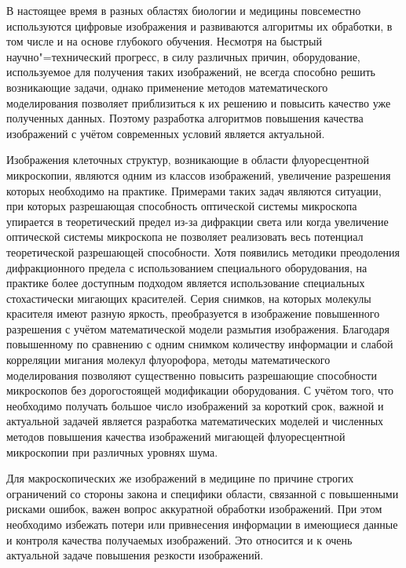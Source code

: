 
{\actuality} 

В настоящее время в разных областях биологии и медицины повсеместно используются цифровые изображения и развиваются алгоритмы их обработки, в том числе и на основе глубокого обучения. Несмотря на быстрый научно"=технический прогресс, в силу различных причин, оборудование, используемое для получения таких изображений, не всегда способно решить возникающие задачи, однако применение методов математического моделирования позволяет приблизиться к их решению и повысить качество уже полученных данных. Поэтому разработка алгоритмов повышения качества изображений с учётом современных условий является актуальной.

Изображения клеточных структур, возникающие в области флуоресцентной микроскопии, являются одним из классов изображений, увеличение разрешения которых необходимо на практике. Примерами таких задач являются ситуации, при которых разрешающая способность оптической системы микроскопа упирается в теоретический предел из-за дифракции света или когда увеличение оптической системы микроскопа не позволяет реализовать весь потенциал теоретической разрешающей способности. Хотя появились методики преодоления дифракционного предела с использованием специального оборудования, на практике более доступным подходом является использование специальных стохастически мигающих красителей. Серия снимков, на которых молекулы красителя имеют разную яркость, преобразуется в изображение повышенного разрешения с учётом математической модели размытия изображения. Благодаря повышенному по сравнению с одним снимком количеству информации и слабой корреляции мигания молекул флуорофора, методы математического моделирования позволяют существенно повысить разрешающие способности микроскопов без дорогостоящей модификации оборудования. С учётом того, что необходимо получать большое число изображений за короткий срок, важной и актуальной задачей является разработка математических моделей и численных методов повышения качества изображений мигающей флуоресцентной микроскопии при различных уровнях шума.

Для макроскопических же изображений в медицине по причине строгих ограничений со стороны закона и специфики области, связанной с повышенными рисками ошибок, важен вопрос аккуратной обработки изображений. При этом необходимо избежать потери или привнесения информации в имеющиеся данные и контроля качества получаемых изображений. Это относится и к очень актуальной задаче повышения резкости изображений.

